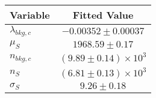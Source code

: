 \begin{tabular}[t]{lc}
\hline
Variable &Fitted Value\\
\hline\hline
$\lambda_{bkg,c}$&$-0.00352\pm0.00037$\\
\hline
$\mu_{S}$&$1968.59\pm0.17$\\
\hline
$n_{bkg,c}$&$(9.89\pm0.14)\times 10^3$\\
\hline
$n_{S}$&$(6.81\pm0.13)\times 10^3$\\
\hline
$\sigma_{S}$&$9.26\pm0.18$\\
\hline
\end{tabular}